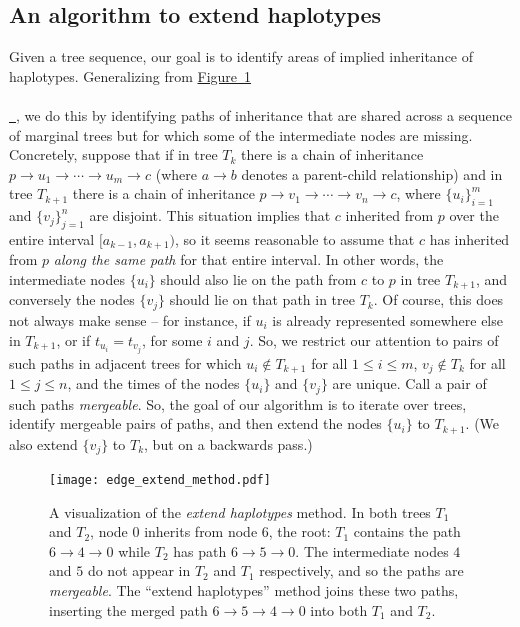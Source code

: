 \documentclass[10pt,twoside,lineno]{gsajnl}
\newcommand*{\figref}[2][]{%
	\hyperref[{#2}]{%
		Figure~\ref*{#2}%
		\ifx\\#1\\%
		\else
		\,#1%
		\fi
	}%
}
\begin{document}
\subsection{An algorithm to extend haplotypes}

Given a tree sequence, our goal is to
identify areas of implied inheritance of haplotypes.
Generalizing from \figref{fig:extending_diagram},
we do this by identifying paths of inheritance that are shared across a sequence of marginal trees
but for which some of the intermediate nodes are missing.
Concretely, suppose that 
if in tree $T_k$ there is a chain of inheritance
$p \to u_1 \to \cdots \to u_m \to c$
(where $a \to b$ denotes a parent-child relationship)
and in tree $T_{k+1}$ there is a chain of inheritance
$p \to v_1 \to \cdots \to v_n \to c$,
where $\{u_i\}_{i=1}^m$ and $\{v_j\}_{j=1}^n$ are disjoint.
This situation implies that $c$ inherited from $p$ over the entire interval $[a_{k-1}, a_{k+1})$,
so it seems reasonable to assume that $c$ has inherited from $p$ \emph{along the same path} for that entire interval.
In other words, the intermediate nodes $\{u_i\}$ should also lie on the path from $c$ to $p$ in tree $T_{k+1}$,
and conversely the nodes $\{v_j\}$ should lie on that path in tree $T_k$.
Of course, this does not always make sense --
for instance, if $u_i$ is already represented somewhere else in $T_{k+1}$,
or if $t_{u_i} = t_{v_j}$, for some $i$ and $j$.
So, we restrict our attention to pairs of such paths in adjacent trees
for which
$u_i \notin T_{k+1}$ for all $1 \le i \le m$,
$v_j \notin T_k$ for all $1 \le j \le n$,
and the times of the nodes $\{u_i\}$ and $\{v_j\}$ are unique.
Call a pair of such paths \emph{mergeable}.
So, the goal of our algorithm is to iterate over trees,
identify mergeable pairs of paths,
and then extend the nodes $\{u_i\}$ to $T_{k+1}$.
(We also extend $\{v_j\}$ to $T_k$, but on a backwards pass.)

\begin{figure}[!ht]
\begin{center}
	\texttt{[image: edge\_extend\_method.pdf]}
\end{center}
\caption{A visualization of the \textit{extend haplotypes} method.
    In both trees $T_1$ and $T_2$,
    node 0 inherits from node 6, the root:
    $T_1$ contains the path $6\to 4\to 0$ while $T_2$ has path $6\to 5\to 0$.
    The intermediate nodes $4$ and $5$ do not appear in $T_2$ and $T_1$ respectively, and so the paths are \textit{mergeable}.
    The ``extend haplotypes'' method joins these two paths,
    inserting the merged path $6\to 5\to 4\to 0$ into both $T_1$ and $T_2$.
    \label{fig:extending_diagram}
}
\end{figure}
\end{document}
